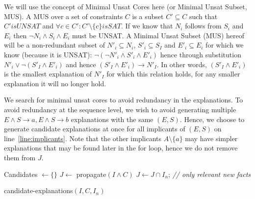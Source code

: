 We will use the concept of Minimal Unsat Cores here (or Minimal Unsat Subset, MUS). A MUS over a set of constraints $C$ is a subset $C' \subseteq C$ such that $C' is UNSAT$ and $\forall c \in C': C' \setminus \{c\} is SAT$. If we know that $N_i$ follows from $S_i$ and $E_i$ then $\neg N_i \wedge S_i \wedge E_i$ must be UNSAT. A Minimal Unsat Subset (MUS) hereof will be a non-redundant subset of $N'_i \subseteq N_i$, $S'_i \subseteq S_I$ and $E'_i \subseteq E_i$ for which we know (because it is UNSAT): $\neg (\neg N'_i \wedge S'_i \wedge E'_i)$ hence through substitution $N'_i \vee \neg (S'_I \wedge E'_i)$ and hence $(S'_I \wedge E'_i) \rightarrow N'_I$. In other words, $(S'_I \wedge E'_i)$ is the smallest explanation of $N'_I$ for which this relation holds, for any smaller explanation it will no longer hold.

We search for minimal unsat cores to avoid redundancy in the explanations. To avoid redundancy at the sequence level, we wish to avoid generating multiple $E \wedge S \rightarrow a, E \wedge S \rightarrow b$ explanations with the same $(E, S)$. Hence, we choose to generate candidate explanations at once for all implicants of $(E, S)$ on line~\ref{line:implicants}. Note that the other implicants $A \setminus \{a\}$ may have simpler explanations that may be found later in the for loop, hence we do not remove them from $J$.

 
\begin{algorithm}
% 

% 

  Candidates $\gets \{\}$\;
  $J \gets$ propagate$(I \wedge C)$\;
  $J \gets J \cap I_n$; \textit{\small // only relevant new facts}\\
\caption{candidate-explanations$(I,C,I_n)$}

\label{alg:cand}
\end{algorithm}

